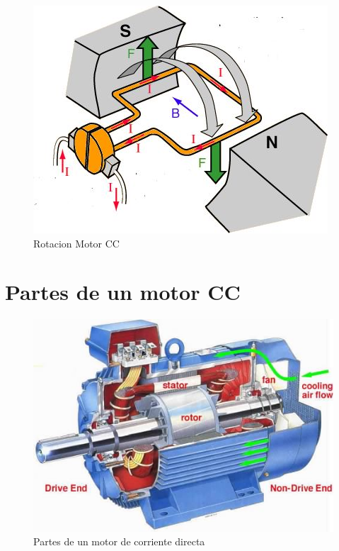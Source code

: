 \documentclass[12pt,a4paper]{article}
\begin{document}
\begin{figure}[hbtp]
\centering
\includegraphics[scale=0.8]{Circuitos/Rotacion.jpg}
\caption{Rotacion Motor CC}
\end{figure}


\newpage
\section{Partes de un motor CC}
\begin{figure}[hbtp]
\centering
\includegraphics[scale=0.3]{Circuitos/Partes.jpg}
\caption{Partes de un motor de corriente directa}
\end{figure}
\end{document}
